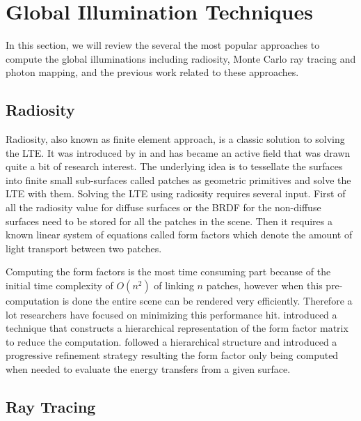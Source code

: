 
\section{Global Illumination Techniques}
In this section, we will review the several the most popular approaches to compute the global illuminations including radiosity, Monte Carlo ray tracing and photon mapping, and the previous work related to these approaches.

\subsection{Radiosity}

Radiosity, also known as finite element approach, is a classic solution to solving the LTE. It was introduced by  \citeauthor{Goral:1984:MIL:964965.808601} in \citep{Goral:1984:MIL:964965.808601} and has became an active field that was drawn quite a bit of research interest. The underlying idea is to tessellate the surfaces into finite small sub-surfaces called patches as geometric primitives and solve the LTE with them. Solving the LTE using radiosity requires several input. First of all the radiosity value for diffuse surfaces or the BRDF for the non-diffuse surfaces need to be stored for all the patches in the scene. Then it requires a known linear system of equations called form factors which denote the amount of light transport between two patches.


Computing the form factors is the most time consuming part because of the initial time complexity of \(O(n^{2})\) of linking \(n\) patches, however when this pre-computation is done the entire scene can be rendered very efficiently. Therefore a lot researchers have focused on minimizing this performance hit. \citeauthor{Hanrahan:1991:RHR:127719.122740} \cite{Hanrahan:1991:RHR:127719.122740} introduced a technique that constructs a hierarchical representation of the form factor matrix to reduce the computation. \citeauthor{Holzschuch94anefficient} \cite{Holzschuch94anefficient} followed a hierarchical structure and introduced a progressive refinement strategy resulting the form factor only being computed when needed to evaluate the energy transfers from a given surface.


\subsection{Ray Tracing}
\label{sec:mc_rt}


